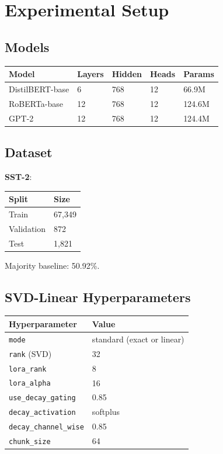 
\section{Experimental Setup}

\subsection{Models}

\begin{table}[H]
\centering
\small
\begin{tabular}{lllll}
\toprule
\textbf{Model} & \textbf{Layers} & \textbf{Hidden} & \textbf{Heads} & \textbf{Params} \\
\midrule
DistilBERT-base & 6 & 768 & 12 & 66.9M \\
RoBERTa-base & 12 & 768 & 12 & 124.6M \\
GPT-2 & 12 & 768 & 12 & 124.4M \\
\bottomrule
\end{tabular}
\end{table}

\subsection{Dataset}

\textbf{SST-2}:

\begin{table}[H]
\centering
\small
\begin{tabular}{ll}
\toprule
\textbf{Split} & \textbf{Size} \\
\midrule
Train & 67,349 \\
Validation & 872 \\
Test & 1,821 \\
\bottomrule
\end{tabular}
\end{table}

Majority baseline: 50.92\%.

\subsection{SVD-Linear Hyperparameters}

\begin{table}[H]
\centering
\small
\begin{tabular}{ll}
\toprule
\textbf{Hyperparameter} & \textbf{Value} \\
\midrule
\texttt{mode} & standard (exact or linear) \\
\texttt{rank} (SVD) & 32 \\
\texttt{lora\_rank} & 8 \\
\texttt{lora\_alpha} & 16 \\
\texttt{use\_decay\_gating} & 0.85 \\
\texttt{decay\_activation} & softplus \\
\texttt{decay\_channel\_wise} & 0.85 \\
\texttt{chunk\_size} & 64 \\
\bottomrule
\end{tabular}
\end{table}

